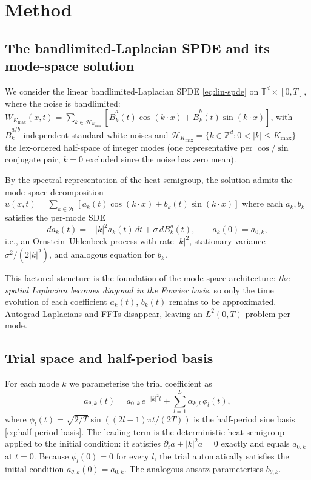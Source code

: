 \section{Method}
\label{sec:method}

\subsection{The bandlimited-Laplacian SPDE and its mode-space solution}
\label{sec:method:spde}

We consider the linear bandlimited-Laplacian SPDE \eqref{eq:lin-spde}
on $\mathbb{T}^d \times [0, T]$, where the noise is bandlimited:
$\dot W_{K_{\max}}(x, t) = \sum_{k \in \mathcal{H}_{K_{\max}}}
[\dot B_k^a(t)\cos(k \cdot x) + \dot B_k^b(t)\sin(k \cdot x)]$,
with $\dot B_k^{a/b}$ independent standard white noises and
$\mathcal{H}_{K_{\max}} = \{k \in \mathbb{Z}^d : 0 < |k| \le K_{\max}\}$
the lex-ordered half-space of integer modes (one representative per
$\cos$/$\sin$ conjugate pair, $k = 0$ excluded since the noise has zero
mean).

By the spectral representation of the heat semigroup, the solution
admits the mode-space decomposition
$u(x, t) = \sum_{k \in \mathcal{H}} [a_k(t)\cos(k \cdot x)
+ b_k(t)\sin(k \cdot x)]$ where each
$a_k, b_k$ satisfies the per-mode SDE
\begin{equation}
da_k(t) = -|k|^2 a_k(t)\, dt + \sigma\, dB_k^a(t), \qquad
a_k(0) = a_{0,k},
\label{eq:ou-mode}
\end{equation}
i.e., an Ornstein--Uhlenbeck process with rate $|k|^2$, stationary
variance $\sigma^2/(2|k|^2)$, and analogous equation for $b_k$.

This factored structure is the foundation of the mode-space
architecture: \emph{the spatial Laplacian becomes diagonal in the
Fourier basis}, so only the time evolution of each coefficient
$a_k(t)$, $b_k(t)$ remains to be approximated. Autograd Laplacians and
FFTs disappear, leaving an $L^2(0, T)$ problem per mode.

\subsection{Trial space and half-period basis}
\label{sec:method:architecture}

For each mode $k$ we parameterise the trial coefficient as
\begin{equation}
a_{\theta, k}(t) = a_{0, k}\,e^{-|k|^2 t} + \sum_{l = 1}^L
\alpha_{k, l}\,\phi_l(t),
\label{eq:trial-ansatz}
\end{equation}
where $\phi_l(t) = \sqrt{2/T}\sin((2l-1)\pi t/(2T))$ is the half-period
sine basis \eqref{eq:half-period-basis}. The leading term is the
deterministic heat semigroup applied to the initial condition: it
satisfies $\partial_t a + |k|^2 a = 0$ exactly and equals $a_{0, k}$ at
$t = 0$. Because $\phi_l(0) = 0$ for every $l$, the trial automatically
satisfies the initial condition $a_{\theta, k}(0) = a_{0, k}$. The
analogous ansatz parameterises $b_{\theta, k}$.

